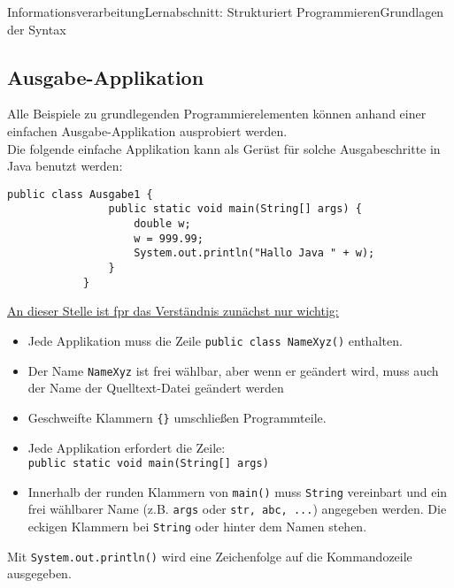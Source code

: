 \documentclass[11pt,oneside,openany,headings=optiontotoc,11pt,numbers=noenddot]{article}
\begin{document}
\begin{worksheet}{Informationsverarbeitung}{Lernabschnitt: Strukturiert Programmieren}{Grundlagen der Syntax}
		\subsection{Ausgabe-Applikation}
		Alle Beispiele zu grundlegenden Programmierelementen können anhand einer einfachen Ausgabe-Applikation ausprobiert werden.\\
		Die folgende \grqq{}einfache\grqq{} Applikation kann als Gerüst für solche Ausgabeschritte in Java benutzt werden:
		\begin{lstlisting}[style=JavaInputStyle]
			public class Ausgabe1 {
				public static void main(String[] args) {
					double w;
					w = 999.99;
					System.out.println("Hallo Java " + w);
				}
			}
		\end{lstlisting}
		\underline{An dieser Stelle ist fpr das Verständnis zunächst nur wichtig:}
		\begin{itemize}
			\item Jede Applikation muss die Zeile \lstinline[style=JavaInputStyle]|public class NameXyz()| enthalten.
			\item Der Name \lstinline[style=JavaInputStyle]|NameXyz| ist frei wählbar, aber wenn er geändert wird, muss auch der Name der Quelltext-Datei geändert werden
			\item Geschweifte Klammern \lstinline[style=JavaInputStyle]|{}| umschließen Programmteile.
			\item Jede Applikation erfordert die Zeile:\\
			\lstinline[style=JavaInputSTyle]|public static void main(String[] args)|
			\item Innerhalb der runden Klammern von \lstinline[style=JavaInputStyle]|main()| muss \lstinline[style=JavaInputStyle]|String| vereinbart und ein frei wählbarer Name (z.B. \lstinline[style=JavaInputStyle]|args| oder \lstinline[style=JavaInputStyle]|str, abc, ...|) angegeben werden. Die eckigen Klammern bei \lstinline[style=JavaInputStyle]|String| oder hinter dem Namen stehen.
		\end{itemize}
		Mit \lstinline[style=JavaInputStyle]|System.out.println()| wird eine Zeichenfolge auf die Kommandozeile ausgegeben.
		

\end{worksheet}
\end{document}
